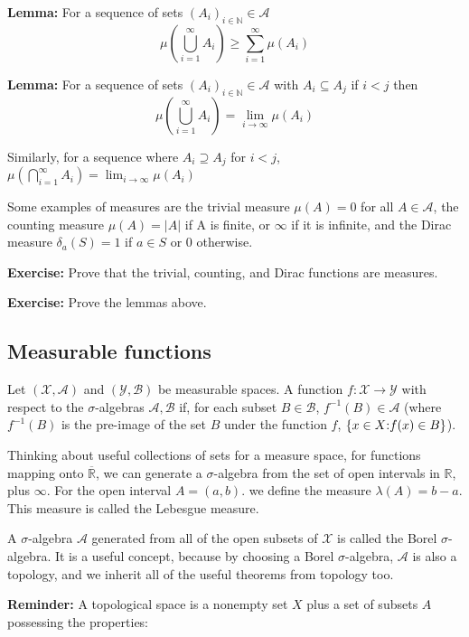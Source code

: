 \documentclass{article}
\begin{document}
\textbf{Lemma:} For a sequence of sets $(A_i)_{i \in \mathbb{N}} \in \mathcal{A}$ 
\[ \mu \left( \bigcup_{i =1}^{\infty} A_i \right) \ge \sum_{i=1}^{\infty} \mu
                \left( A_i \right) \]

\textbf{Lemma:} For a sequence of sets $(A_i)_{i \in \mathbb{N}} \in \mathcal{A}$ with 
$A_i \subseteq A_j$ if $i<j$ then 
\[ \mu \left( \bigcup_{i =1}^{\infty} A_i \right)= \lim_{i \rightarrow \infty} \mu(A_i) \]

Similarly, for a sequence where $A_i \supseteq A_j$ for $i<j$, 
$\mu \left( \bigcap_{i =1}^{\infty} A_i \right)= \lim_{i \rightarrow \infty} \mu(A_i)$

Some examples of measures are the trivial measure $\mu(A)=0$ for all $A \in \mathcal{A}$,
the counting measure $\mu(A) = |A|$ if A is finite, or $\infty$ if it is infinite, and the
Dirac measure $\delta_a(S) = 1$ if $a \in S$ or 0 otherwise.

\textbf{Exercise:} Prove that the trivial, counting, and Dirac functions are measures.

\textbf{Exercise:} Prove the lemmas above.

\subsection{Measurable functions}

Let $\left(\mathcal{X}, \mathcal{A}\right)$ and $\left(\mathcal{Y}, \mathcal{B}\right)$
be measurable spaces. A function $f:\mathcal{X} \rightarrow \mathcal{Y}$ with respect to the 
$\sigma$-algebras $\mathcal{A}, \mathcal{B}$ if, for each subset $B \in \mathcal{B}$, 
$f^{-1}(B) \in \mathcal{A}$ (where $f^{-1}(B)$ is the pre-image of the set $B$ under the 
function $f$, $\{x \in X \text: f(x) \in B\}$).

Thinking about useful collections of sets for a measure space, for functions mapping onto 
$\overline{\mathbb{R}}$, we can generate a $\sigma$-algebra from the set of open intervals
in $\mathbb{R}$, plus $\infty$.
For the open interval $A=(a,b)$. we define the measure $\lambda (A) = b-a$. This measure
is called the Lebesgue measure.

A $\sigma$-algebra $\mathcal{A}$ generated from all of the open subsets of $\mathcal{X}$
is called the Borel $\sigma$-algebra. It is a useful concept, because by choosing a Borel
$\sigma$-algebra, $\mathcal{A}$ is also a topology, and we inherit all of the useful
theorems from topology too.

\textbf{Reminder:} A topological space is a nonempty set $X$ plus a set of subsets $A$ possessing
the properties:
\end{document}
